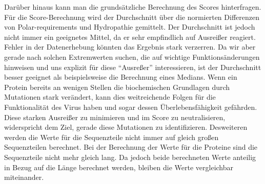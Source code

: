 \documentclass[german,version-2022-01]{uzl-thesis}
\begin{document}
Dar\"uber hinaus kann man die grunds\"atzliche Berechnung des Scores hinterfragen. F\"ur die Score-Berechnung wird der Durchschnitt \"uber die normierten Differenzen von Polar-requirements und Hydropathie gemittelt. Der Durchschnitt ist jedoch nicht immer ein geeignetes Mittel, da er sehr empfindlich auf Ausrei\ss{}er reagiert. Fehler in der Datenerhebung k\"onnten das Ergebnis stark verzerren. Da wir aber gerade nach solchen Extremwerten suchen, die auf wichtige Funktions\"anderungen hinweisen und uns explizit f\"ur diese "`Ausre\ss{}er"' interessieren, ist der Durchschnitt besser geeignet als beispielsweise die Berechnung eines Medians. Wenn ein Protein bereits an wenigen Stellen die biochemischen Grundlagen durch Mutationen stark ver\"andert, kann dies weitreichende Folgen f\"ur die Funktionalit\"at des Virus haben und sogar dessen \"Uberlebensf\"ahigkeit gef\"ahrden. Diese starken Ausrei\ss{}er zu minimieren und im Score zu neutralisieren, widerspricht dem Ziel, gerade diese Mutationen zu identifizieren. Desweiteren werden die Werte f\"ur die Sequenzteile nicht immer auf gleich gro\ss{}en Sequenzteilen berechnet. Bei der Berechnung der Werte f\"ur die Proteine sind die Sequenzteile nicht mehr gleich lang. Da jedoch beide berechneten Werte anteilig in Bezug auf die L\"ange berechnet werden, bleiben die Werte vergleichbar miteinander.
\end{document}
